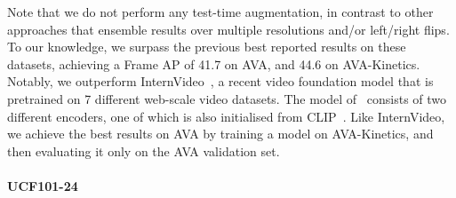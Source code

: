 \documentclass[10pt,twocolumn,letterpaper]{article}
\def \paravspace {-0.7\baselineskip}
\begin{document}
Note that we do not perform any test-time augmentation, in contrast to other approaches that ensemble results over multiple resolutions and/or left/right flips.
To our knowledge, we surpass the previous best reported results on these datasets, achieving a Frame AP of 41.7 on AVA, and 44.6 on AVA-Kinetics.
Notably, we outperform InternVideo~\cite{wang2022internvideo}, a recent video foundation model that is pretrained on 7 different web-scale video datasets.
The model of~\cite{wang2022internvideo} consists of two different encoders, one of which is also initialised from CLIP~\cite{radford2021learning}.
Like InternVideo, we achieve the best results on AVA by training a model on AVA-Kinetics, and then evaluating it only on the AVA validation set.

\vspace{\paravspace}
\paragraph{UCF101-24}
\end{document}
